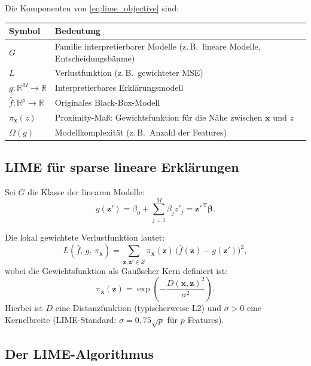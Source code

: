 ﻿\documentclass[a4paper,12pt]{article}
\theoremstyle{definition}
\begin{document}
Die Komponenten von \eqref{eq:lime_objective} sind:

\begin{center}
\begin{tabular}{@{}lp{10cm}@{}}
  \toprule
  Symbol & Bedeutung \\
  \midrule
  $G$ & Familie interpretierbarer Modelle (z.\,B.\ lineare Modelle, Entscheidungsbäume) \\
  $L$ & Verlustfunktion (z.\,B.\ gewichteter MSE) \\
  $g: \mathbb{R}^M \to \mathbb{R}$ & Interpretierbares Erklärungsmodell \\
  $\hat{f}: \mathbb{R}^p \to \mathbb{R}$ & Originales Black-Box-Modell \\
  $\pi_\mathbf{x}(z)$ & Proximity-Maß: Gewichtsfunktion für die Nähe zwischen $\mathbf{x}$ und $z$ \\
  $\Omega(g)$ & Modellkomplexität (z.\,B.\ Anzahl der Features) \\
  \bottomrule
\end{tabular}
\end{center}

\subsection{LIME für sparse lineare Erklärungen}

Sei $G$ die Klasse der linearen Modelle:
\begin{equation}
  g(\mathbf{z}') = \beta_0 + \sum_{j=1}^{M} \beta_j z'_j = \mathbf{z}'^{\,\mathrm{T}} \boldsymbol{\beta}.
\end{equation}

Die lokal gewichtete Verlustfunktion lautet:
\begin{equation}
  L\!\left(\hat{f},\, g,\, \pi_\mathbf{x}\right)
  = \sum_{\mathbf{z},\mathbf{z}' \in Z}
    \pi_\mathbf{x}(\mathbf{z})\,\bigl(\hat{f}(\mathbf{z}) - g(\mathbf{z}')\bigr)^2,
  \label{eq:lime_loss}
\end{equation}
wobei die Gewichtsfunktion als Gaußscher Kern definiert ist:
\begin{equation}
  \pi_\mathbf{x}(\mathbf{z})
  = \exp\!\left(-\frac{D(\mathbf{x}, \mathbf{z})^2}{\sigma^2}\right).
  \label{eq:lime_kernel}
\end{equation}
Hierbei ist $D$ eine Distanzfunktion (typischerweise L2) und $\sigma > 0$ eine
Kernelbreite (LIME-Standard: $\sigma = 0{,}75\sqrt{p}$ für $p$ Features).

\subsection{Der LIME-Algorithmus}
\end{document}
